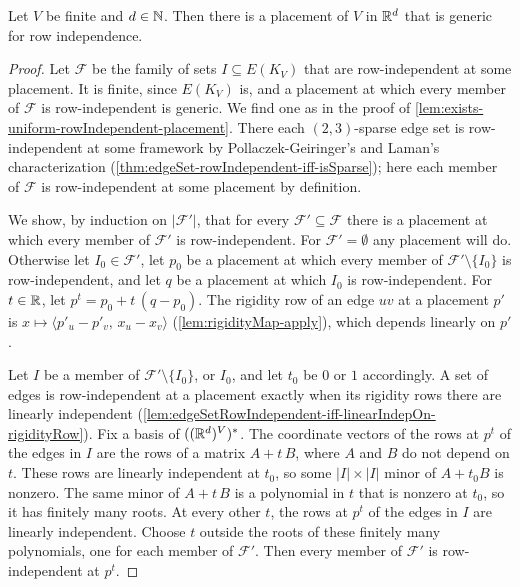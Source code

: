 \begin{lemma}
  \label{lem:exists-generic-placement}
  \leanok
  Let $V$ be finite and $d \in {\mathbb{N}}$. Then there is a placement of $V$ in
  ${\mathbb{R}}^{d}$ that is generic for row independence.
\end{lemma}
\begin{proof}
  \leanok
  Let $\mathcal{F}$ be the family of sets $I \subseteq E(K_V)$ that are
  row-independent at some placement. It is finite, since $E(K_V)$ is,
  and a placement at which every member of $\mathcal{F}$ is
  row-independent is generic. We find one as in the proof of
  \cref{lem:exists-uniform-rowIndependent-placement}. There each
  $(2,3)$-sparse edge set is row-independent at some framework by
  Pollaczek-Geiringer's and Laman's characterization
  (\cref{thm:edgeSet-rowIndependent-iff-isSparse}); here each member of
  $\mathcal{F}$ is row-independent at some placement by definition.

  We show, by induction on $|\mathcal{F}'|$, that for every
  $\mathcal{F}' \subseteq \mathcal{F}$ there is a placement at which
  every member of $\mathcal{F}'$ is row-independent. For
  $\mathcal{F}' = \emptyset$ any placement will do. Otherwise let
  $I_0 \in \mathcal{F}'$, let $p_0$ be a placement at which every
  member of $\mathcal{F}' \setminus \{I_0\}$ is row-independent, and
  let $q$ be a placement at which $I_0$ is row-independent. For
  $t \in {\mathbb{R}}$, let $p^{t} = p_0 + t\,(q - p_0)$. The rigidity row of an
  edge $uv$ at a placement $p'$ is
  $x \mapsto \langle p'_u - p'_v,\, x_u - x_v \rangle$
  (\cref{lem:rigidityMap-apply}), which depends linearly on $p'$.

  Let $I$ be a member of $\mathcal{F}' \setminus \{I_0\}$, or $I_0$,
  and let $t_0$ be $0$ or $1$ accordingly. A set of edges is
  row-independent at a placement exactly when its rigidity rows there
  are linearly independent
  (\cref{lem:edgeSetRowIndependent-iff-linearIndepOn-rigidityRow}).
  Fix a basis of $(({\mathbb{R}}^{d})^{V})^{*}$. The coordinate vectors of the
  rows at $p^{t}$ of the edges in $I$ are the rows of a matrix
  $A + t\,B$, where $A$ and $B$ do not depend on $t$. These rows are
  linearly independent at $t_0$, so some $|I| \times |I|$ minor of
  $A + t_0 B$ is nonzero. The same minor of $A + t\,B$ is a polynomial
  in $t$ that is nonzero at $t_0$, so it has finitely many roots. At
  every other $t$, the rows at $p^{t}$ of the edges in $I$ are linearly
  independent. Choose $t$ outside the roots of these finitely many
  polynomials, one for each member of $\mathcal{F}'$. Then every member
  of $\mathcal{F}'$ is row-independent at $p^{t}$.
\end{proof}

